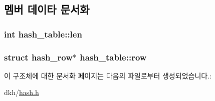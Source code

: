 \subsection{멤버 데이타 문서화}
\hypertarget{structhash__table_a5c37715c358be0aea139f968bd44d3ae}{
\subsubsection[{len}]{\setlength{\rightskip}{0pt plus 5cm}int hash\+\_\+table\+::len}}\label{structhash__table_a5c37715c358be0aea139f968bd44d3ae}
\hypertarget{structhash__table_a634ff501f78f223799d4923fbcbbf30d}{
\subsubsection[{row}]{\setlength{\rightskip}{0pt plus 5cm}struct {\bf hash\+\_\+row}$\ast$ hash\+\_\+table\+::row}}\label{structhash__table_a634ff501f78f223799d4923fbcbbf30d}


이 구조체에 대한 문서화 페이지는 다음의 파일로부터 생성되었습니다.\+:\begin{DoxyCompactItemize}
\item 
dkh/\hyperlink{hash_8h}{hash.\+h}\end{DoxyCompactItemize}
